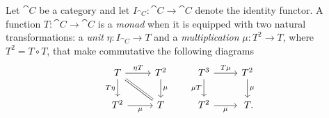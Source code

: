 \begin{defn}
    Let $\cat C$ be a category and let $I_{\cat C}\colon\cat C\to\cat C$ denote the identity functor. A function $T\colon\cat C\to\cat C$ is a \textsl{monad} when it is equipped with two natural transformations: a \textsl{unit} $\eta\colon I_{\cat C}\to T$ and a \textsl{multiplication} $\mu\colon T^2\to T$, where $T^2=T\circ T$, that make commutative the following diagrams
    $$
        \begin{tikzcd}
            T
                    \arrow[r,"\eta T"]
                    \arrow[d,"T\eta"']
                    \arrow[rd,equal]
                &T^2
                    \arrow[d,"\mu"]
                &T^3
                    \arrow[d,"\mu T"']
                    \arrow[r,"T\mu"]
                &T^2
                    \arrow[d,"\mu"]\\
            T^2
                    \arrow[r,"\mu"']
                &T
                &T^2
                    \arrow[r,"\mu"']
                &\hphantom.T.
        \end{tikzcd}
    $$
\end{defn}

